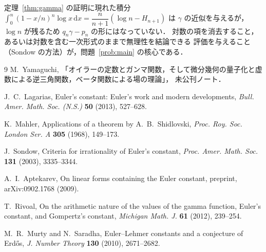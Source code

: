 \documentclass[a4paper,11pt]{ltjsarticle}
\theoremstyle{plain}
\theoremstyle{definition}
\newcommand{\dd}{\,\mathrm{d}}
\begin{document}
定理~\ref{thm:gamma} の証明に現れた積分
$\int_0^{n}(1-x/n)^{n}\log x\dd x=\dfrac{n}{n+1}(\log n-H_{n+1})$
は $\gamma$ の近似を与えるが，$\log n$ が残るため $q_n\gamma-p_n$ の形にはなっていない．
対数の項を消去すること，あるいは対数を含む一次形式のままで無理性を結論できる
評価を与えること（Sondow \cite{Sondow} の方法）が，問題~\ref{prob:main} の核心である．

\begin{thebibliography}{9}
M.~Yamaguchi,
「オイラーの定数とガンマ関数，そして微分幾何の量子化と虚数による逆三角関数，ベータ関数による場の理論」，
未公刊ノート．

J.~C.~Lagarias,
Euler's constant: Euler's work and modern developments,
\textit{Bull. Amer. Math. Soc. (N.S.)} \textbf{50} (2013), 527--628.

K.~Mahler,
Applications of a theorem by A.~B.~Shidlovski,
\textit{Proc. Roy. Soc. London Ser. A} \textbf{305} (1968), 149--173.

J.~Sondow,
Criteria for irrationality of Euler's constant,
\textit{Proc. Amer. Math. Soc.} \textbf{131} (2003), 3335--3344.

A.~I.~Aptekarev,
On linear forms containing the Euler constant,
preprint, arXiv:0902.1768 (2009).

T.~Rivoal,
On the arithmetic nature of the values of the gamma function, Euler's constant, and Gompertz's constant,
\textit{Michigan Math. J.} \textbf{61} (2012), 239--254.

M.~R.~Murty and N.~Saradha,
Euler--Lehmer constants and a conjecture of Erd\H{o}s,
\textit{J. Number Theory} \textbf{130} (2010), 2671--2682.
\end{thebibliography}
\end{document}
